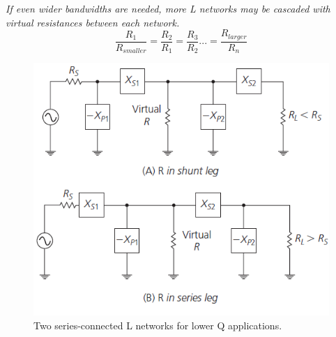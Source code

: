 \noindent\textit{If even wider bandwidths are needed, more L networks may be	cascaded with virtual resistances between each network.}
\begin{equation}
\dfrac{R_1}{R_{smaller}} = \dfrac{R_2}{R_1}= \dfrac{R_3}{R_2} ... = \dfrac{R_{larger}}{R_n}
\end{equation}

\begin{figure} [H]
	\centering
	\includegraphics[width=0.8\linewidth]{graphics/30.png}
	\caption{Two series-connected L networks for lower Q applications.}
	\label{fig:30}
\end{figure}